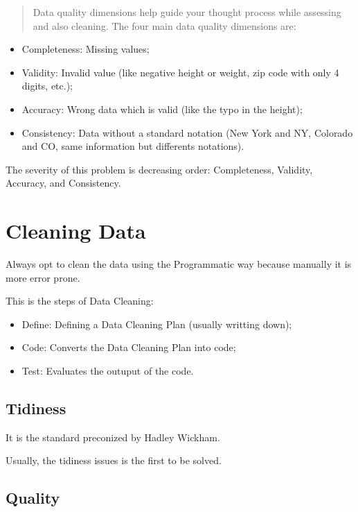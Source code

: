 \documentclass[]{book}
\providecommand{\tightlist}{%
  \setlength{\itemsep}{0pt}\setlength{\parskip}{0pt}}
\begin{document}
\begin{quote}
Data quality dimensions help guide your thought process while assessing
and also cleaning. The four main data quality dimensions are:
\end{quote}

\begin{itemize}
\tightlist
\item
  Completeness: Missing values;
\item
  Validity: Invalid value (like negative height or weight, zip code with
  only 4 digits, etc.);
\item
  Accuracy: Wrong data which is valid (like the typo in the height);
\item
  Consistency: Data without a standard notation (New York and NY,
  Colorado and CO, same information but differents notations).
\end{itemize}

The severity of this problem is decreasing order: Completeness,
Validity, Accuracy, and Consistency.

\section{Cleaning Data}\label{cleaning-data}

Always opt to clean the data using the Programmatic way because manually
it is more error prone.

This is the steps of Data Cleaning:

\begin{itemize}
\tightlist
\item
  Define: Defining a Data Cleaning Plan (usually writting down);
\item
  Code: Converts the Data Cleaning Plan into code;
\item
  Test: Evaluates the outuput of the code.
\end{itemize}

\subsection{Tidiness}\label{tidiness-1}

It is the standard preconized by Hadley Wickham.

Usually, the tidiness issues is the first to be solved.

\subsection{Quality}\label{quality-1}
\end{document}
